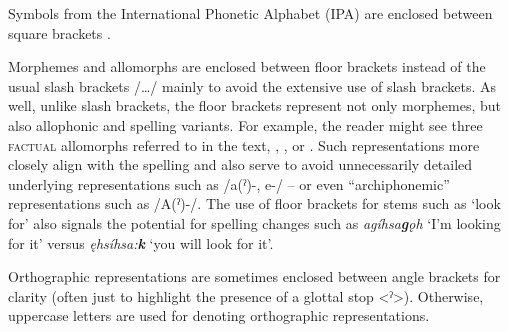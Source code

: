 Symbols from the International Phonetic Alphabet (IPA) are enclosed between square brackets . 

Morphemes and allomorphs are enclosed between floor brackets  instead of the usual slash brackets /…/ mainly to avoid the extensive use of slash brackets. As well, unlike slash brackets, the floor brackets represent not only morphemes, but also allophonic and spelling variants. For example, the reader might see three \textsc{factual} allomorphs referred to in the text, , , or . Such representations more closely align with the spelling and also serve to avoid unnecessarily detailed underlying representations such as /a(ˀ)-, e-/ -- or even “archiphonemic” representations such as /A(ˀ)-/. The use of floor brackets for stems such as  ‘look for’ also signals the potential for spelling changes such as \textit{agíhsa\textbf{g}ǫh} ‘I’m looking for it’ versus \textit{ęhsíhsa:\textbf{k}} ‘you will look for it’.

Orthographic representations are sometimes enclosed between angle brackets for clarity (often just to highlight the presence of a glottal stop <ˀ>). Otherwise, uppercase letters are used for denoting orthographic representations.
